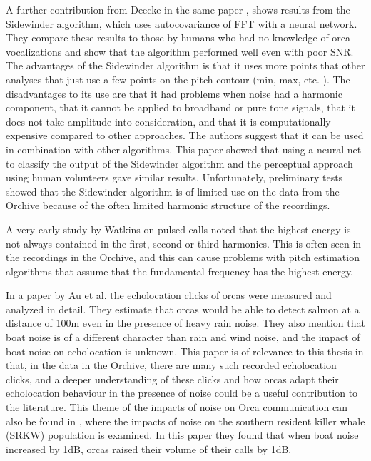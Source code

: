 \documentclass[12pt,oneside]{book}
\begin{document}
A further contribution from Deecke in the same paper
\cite{deecke1999quantifying}, shows results from the Sidewinder
algorithm, which uses autocovariance of FFT with a neural network.
They compare these results to those by humans who had no knowledge of
orca vocalizations and show that the algorithm performed well even
with poor SNR.  The advantages of the Sidewinder algorithm is that it
uses more points that other analyses that just use a few points on the
pitch contour (min, max, etc. \cite{au2000hearing}).  The
disadvantages to its use are that it had problems when noise had a
harmonic component, that it cannot be applied to broadband or pure
tone signals, that it does not take amplitude into consideration, and
that it is computationally expensive compared to other approaches.
The authors suggest that it can be used in combination with other
algorithms.  This paper showed that using a neural net to classify the
output of the Sidewinder algorithm and the perceptual approach using
human volunteers gave similar results.  Unfortunately, preliminary
tests showed that the Sidewinder algorithm is of limited use on the
data from the Orchive because of the often limited harmonic structure
of the recordings.

A very early study by Watkins \cite{watkins1967harmonic} on pulsed
calls noted that the highest energy is not always contained in the
first, second or third harmonics.  This is often seen in the
recordings in the Orchive, and this can cause problems with pitch
estimation algorithms that assume that the fundamental frequency has
the highest energy.

In a paper by Au et al. \cite{au2004echolocation} the echolocation
clicks of orcas were measured and analyzed in detail.  They estimate
that orcas would be able to detect salmon at a distance of 100m even
in the presence of heavy rain noise.  They also mention that boat
noise is of a different character than rain and wind noise, and the
impact of boat noise on echolocation is unknown.  This paper is of
relevance to this thesis in that, in the data in the Orchive, there
are many such recorded echolocation clicks, and a deeper understanding
of these clicks and how orcas adapt their echolocation behaviour in
the presence of noise could be a useful contribution to the
literature.  This theme of the impacts of noise on Orca communication
can also be found in \cite{holt2009speakingup}, where the impacts of
noise on the southern resident killer whale (SRKW) population is
examined.  In this paper they found that when boat noise increased by
1dB, orcas raised their volume of their calls by 1dB.
\end{document}
